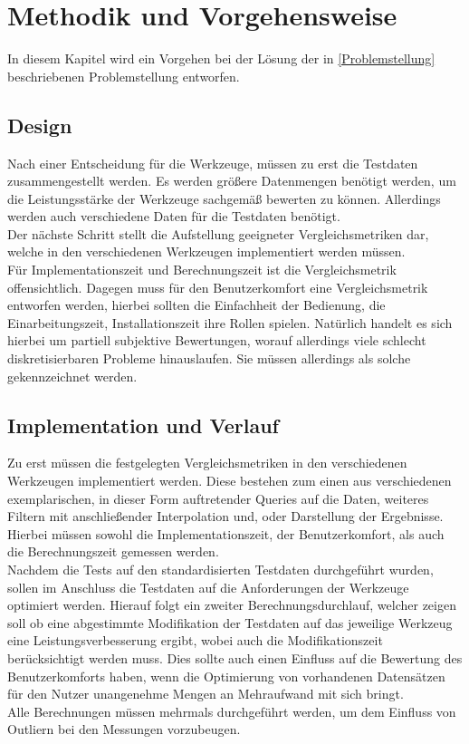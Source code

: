 \documentclass[
	12pt,
	a4paper,
	BCOR10mm,
	DIV14,
	listof=totoc,
	bibliography=totoc,
	headsepline
]{scrreprt}
\begin{document}
\chapter{Methodik und Vorgehensweise}
\label{Methodik und Vorgehensweise}
In diesem Kapitel wird ein Vorgehen bei der Lösung der in \ref{Problemstellung} beschriebenen Problemstellung entworfen.
\section{Design}
Nach einer Entscheidung für die Werkzeuge, müssen zu erst die Testdaten zusammengestellt werden.
Es werden größere Datenmengen benötigt werden, um die Leistungsstärke der Werkzeuge sachgemäß bewerten zu können.
Allerdings werden auch verschiedene Daten für die Testdaten benötigt. \\
Der nächste Schritt stellt die Aufstellung geeigneter Vergleichsmetriken dar, welche in den verschiedenen Werkzeugen implementiert werden müssen. \\
Für Implementationszeit und Berechnungszeit ist die Vergleichsmetrik offensichtlich.
Dagegen muss für den Benutzerkomfort eine Vergleichsmetrik entworfen werden, hierbei sollten die Einfachheit der Bedienung, die Einarbeitungszeit, Installationszeit ihre Rollen spielen.
Natürlich handelt es sich hierbei um partiell subjektive Bewertungen, worauf allerdings viele schlecht diskretisierbaren Probleme hinauslaufen. 
Sie müssen allerdings als solche gekennzeichnet werden.

\section{Implementation und Verlauf}
Zu erst müssen die festgelegten Vergleichsmetriken in den verschiedenen Werkzeugen implementiert werden.
Diese bestehen zum einen aus verschiedenen exemplarischen, in dieser Form auftretender Queries auf die Daten, weiteres Filtern mit anschließender Interpolation und, oder Darstellung der Ergebnisse.
Hierbei müssen sowohl die Implementationszeit, der Benutzerkomfort, als auch die Berechnungszeit gemessen werden. \\
Nachdem die Tests auf den standardisierten Testdaten durchgeführt wurden, sollen im Anschluss die Testdaten auf die Anforderungen der Werkzeuge optimiert werden. 
Hierauf folgt ein zweiter Berechnungsdurchlauf, welcher zeigen soll ob eine abgestimmte Modifikation der Testdaten auf das jeweilige Werkzeug eine Leistungsverbesserung ergibt, wobei auch die Modifikationszeit berücksichtigt werden muss. 
Dies sollte auch einen Einfluss auf die Bewertung des Benutzerkomforts haben, wenn die Optimierung von vorhandenen Datensätzen für den Nutzer unangenehme Mengen an Mehraufwand mit sich bringt. \\
Alle Berechnungen müssen mehrmals durchgeführt werden, um dem Einfluss von Outliern bei den Messungen vorzubeugen. \\
\end{document}
